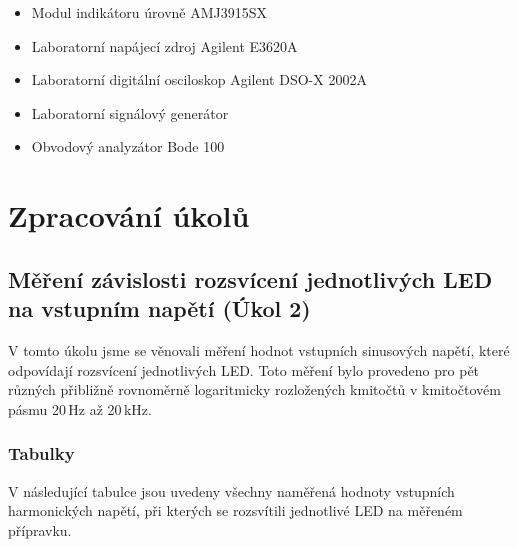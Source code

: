 \documentclass[a4paper, czech]{article}
\begin{document}
\begin{itemize}
    \item Modul indikátoru úrovně AMJ3915SX
    \item Laboratorní napájecí zdroj Agilent E3620A
    \item Laboratorní digitální osciloskop Agilent DSO-X 2002A
    \item Laboratorní signálový generátor
    \item Obvodový analyzátor Bode 100
\end{itemize}

\section{Zpracování úkolů}

\subsection{Měření závislosti rozsvícení jednotlivých LED na vstupním napětí (Úkol 2)}

V tomto úkolu jsme se věnovali měření hodnot vstupních sinusových napětí, které odpovídají rozsvícení jednotlivých LED.
Toto měření bylo provedeno pro pět různých přibližně rovnoměrně logaritmicky rozložených kmitočtů v kmitočtovém pásmu 20\,Hz až 20\,kHz.

\subsubsection{Tabulky}

V následující tabulce jsou uvedeny všechny naměřená hodnoty vstupních harmonických napětí, při kterých se rozsvítili jednotlivé LED na měřeném přípravku.
\end{document}

